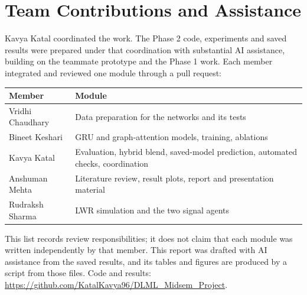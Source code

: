 \documentclass[conference]{IEEEtran}
\begin{document}
\section*{Team Contributions and Assistance}
Kavya Katal coordinated the work. The Phase 2 code, experiments and saved results were prepared under that coordination with substantial AI assistance, building on the teammate prototype and the Phase 1 work. Each member integrated and reviewed one module through a pull request:

\smallskip
{\centering\small
\begin{tabular}{@{}p{}p{}@{}}\toprule
Member & Module\\\midrule
Vridhi Chaudhary & Data preparation for the networks and its tests\\
Bineet Keshari & GRU and graph-attention models, training, ablations\\
Kavya Katal & Evaluation, hybrid blend, saved-model prediction, automated checks, coordination\\
Anshuman Mehta & Literature review, result plots, report and presentation material\\
Rudraksh Sharma & LWR simulation and the two signal agents\\
\bottomrule\end{tabular}\par}
\smallskip

\noindent This list records review responsibilities; it does not claim that each module was written independently by that member. This report was drafted with AI assistance from the saved results, and its tables and figures are produced by a script from those files. Code and results: \url{https://github.com/KatalKavya96/DLML_Midsem_Project}.
\end{document}
